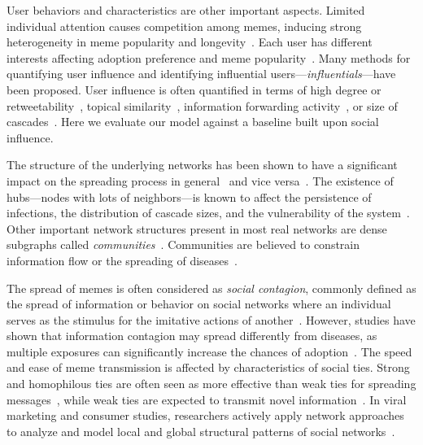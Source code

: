 \documentclass[letterpaper]{article}
\begin{document}
User behaviors and characteristics are other important aspects. Limited individual attention causes competition
among memes, inducing strong heterogeneity in meme popularity and 
longevity~\cite{Weng:2012scirep}. Each user has different interests affecting 
adoption preference and meme popularity~\cite{Mei2012tags}.
Many methods for quantifying user influence and identifying influential users---\emph{influentials}---have been proposed. User influence is often quantified in terms of high degree or retweetability~\cite{cha2010measuring,Suh2010}, topical
similarity~\cite{tang2009social,weng2010twitterrank}, information forwarding
activity~\cite{romero2011influence,Suh2010}, or size of cascades~\cite{Kitsak2010kcore,bakshy_everyones_2011}. Here we evaluate our model against a baseline built upon social influence.


The structure of the underlying networks has been shown to have a significant impact on the spreading process in general~\cite{daley_epidemics_1964,goffman1964nature,vesp2008book,vespignani2001SISonSF} and vice versa~\cite{weng2013shortcut}. The existence of hubs---nodes with lots of neighbors---is known to affect the persistence of infections, the distribution of cascade sizes, and the vulnerability of the system~\cite{vespignani2001SISonSF,Watts2002}. Other important network structures present in most real networks are dense subgraphs called \emph{communities}~\cite{newman2006modularity,Rosvall2008InfoMap,Ahn2010LinkCommunity,fortunato2010community}. Communities are believed to constrain information flow or the spreading of diseases~\cite{weak_ties_1973,JP2007pnas,Rosvall2008InfoMap,colbaugh2012early,weng2013viral}.  



The spread of memes is often considered as \emph{social contagion}, commonly defined as the spread of information or behavior on social networks where an individual serves as the stimulus for the imitative actions of another~\cite{contagion1985,goffman1964nature,daley_epidemics_1964}. However, studies have shown that information contagion may spread differently from diseases, as multiple exposures can significantly increase the chances of adoption~\cite{threshold_model,Centola2010SpreadExp,romero_differences_2011}.
The speed and ease of meme transmission is affected by characteristics of social ties.  Strong and homophilous ties are often seen as more effective than weak ties for spreading messages~\cite{Brown:1987kx}, while weak ties are expected to transmit novel information~\cite{weak_ties_1973}.  In viral marketing and consumer studies, researchers actively apply network approaches to analyze and model local and global structural patterns of social networks~\cite{Leskovec2007viral,Mason2008propagation,aral2011viral}.  
\end{document}
